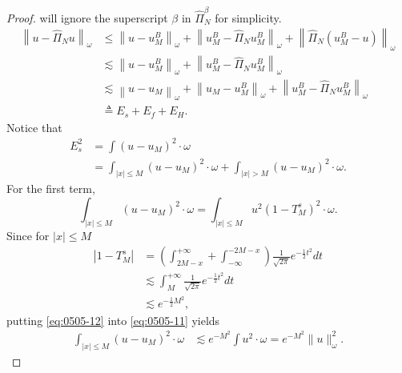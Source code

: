\documentclass[10pt,a4paper]{amsart}
\begin{document}
\begin{proof}
  will ignore the superscript $\beta$ in $\widehat{\Pi}_N^\beta$ for simplicity.
  \begin{equation}\label{eq:0505-9}
    \begin{aligned}
    \left\|u-\widehat{\Pi}_N u\right\|_\omega & \leqslant\left\|u-u_M^B\right\|_\omega+\left\|u_M^B-\widehat{\Pi}_N u_M^B\right\|_\omega+\left\|\widehat{\Pi}_N\left(u_M^B-u\right)\right\|_\omega \\
    & \lesssim\left\|u-u_M^B\right\|_\omega+\left\|u_M^B-\widehat{\Pi}_N u_M^B\right\|_\omega \\
    & \lesssim\left\|u-u_M\right\|_\omega+\left\|u_M-u_M^B\right\|_\omega+\left\|u_M^B-\widehat{\Pi}_N u_M^B\right\|_\omega \\
    & \triangleq E_s+E_f+E_H.
    \end{aligned}
  \end{equation}
  Notice that
  \begin{equation}\label{eq:0505-10}
    \begin{aligned}
    E_s^2 & =\int\left(u-u_M\right)^2 \cdot \omega \\
    & =\int_{|x| \leqslant M}\left(u-u_M\right)^2 \cdot \omega+\int_{|x|>M}\left(u-u_M\right)^2 \cdot \omega.
    \end{aligned}
  \end{equation}
  For the first term,
  \begin{equation}\label{eq:0505-11}
    \int_{|x| \leqslant M}(u-u_M)^2 \cdot \omega=\int_{|x| \leqslant M} u^2\left(1-T_M^s\right)^2 \cdot \omega.
  \end{equation}
  Since for $|x| \leqslant M$
  \begin{equation}\label{eq:0505-12}
    \begin{aligned}
    \left|1-T_M^s\right| & =\left(\int_{2 M-x}^{+\infty}+\int_{-\infty}^{-2 M-x}\right) \frac{1}{\sqrt{2 \pi}} e^{-\frac{1}{2} t^2} d t \\
    & \lesssim \int_M^{+\infty} \frac{1}{\sqrt{2 \pi}} e^{-\frac{1}{2} t^2} d t \\
    & \lesssim e^{-\frac{1}{2} M^2},
    \end{aligned}
  \end{equation}
  putting \eqref{eq:0505-12} into \eqref{eq:0505-11} yields
  \begin{equation}\label{eq:0505-13}
    \begin{aligned}
    \int_{|x| \leqslant M}\left(u-u_M\right)^2 \cdot \omega & \lesssim e^{-M^2} \int u^2 \cdot \omega =e^{-M^2}\|u\|_\omega^2.
    \end{aligned}

\end{equation}
\end{proof}
\end{document}
